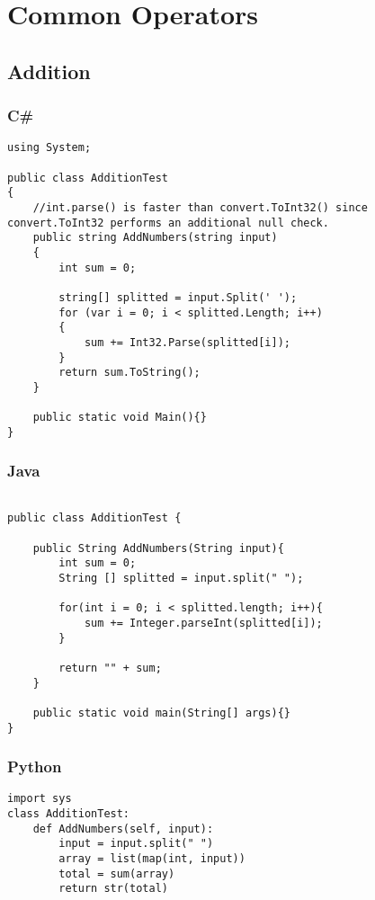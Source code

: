\section{Common Operators}

\subsection{Addition} \label{appendix:code_addition}

\subsubsection{C\#}
\lstset{style=sharpc}
\begin{lstlisting}
using System;

public class AdditionTest
{
    //int.parse() is faster than convert.ToInt32() since convert.ToInt32 performs an additional null check.
    public string AddNumbers(string input)
    {
        int sum = 0;

        string[] splitted = input.Split(' ');
        for (var i = 0; i < splitted.Length; i++)
        {
            sum += Int32.Parse(splitted[i]);
        }
        return sum.ToString();
    }

    public static void Main(){}
}

\end{lstlisting}

\subsubsection{Java}
\lstset{style=java}
\begin{lstlisting}

public class AdditionTest {

	public String AddNumbers(String input){
		int sum = 0;
		String [] splitted = input.split(" ");

		for(int i = 0; i < splitted.length; i++){
			sum += Integer.parseInt(splitted[i]);
		}

		return "" + sum;
	}

	public static void main(String[] args){}
}

\end{lstlisting}

\subsubsection{Python}
\lstset{style=python}
\begin{lstlisting}
import sys
class AdditionTest:
    def AddNumbers(self, input):
        input = input.split(" ")
        array = list(map(int, input))
        total = sum(array)
        return str(total)
	\end{lstlisting}



